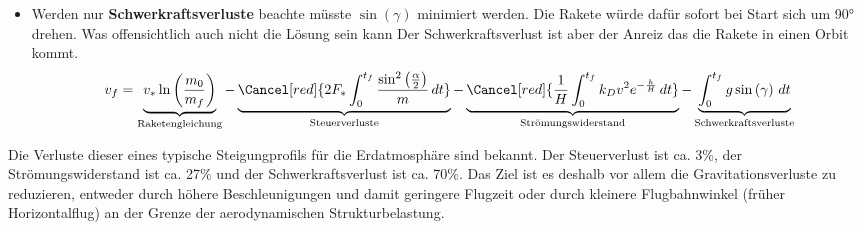 \begin{itemize}
	\item Werden nur \textbf{Schwerkraftsverluste} beachte müsste $\sin(\gamma)$ minimiert werden.
	Die Rakete würde dafür sofort bei Start sich um 90° drehen.
	Was offensichtlich auch nicht die Lösung sein kann
	Der Schwerkraftsverlust ist aber der Anreiz das die Rakete in einen Orbit kommt.
	\begin{equation*}
		v_f = \underbrace{v_* \ln \left(\frac{m_0}{m_f}\right)}_{\text{Raketengleichung}} 
		- \underbrace{\Cancel[red]{2F_* \int_0^{t_f} \frac{\sin^2\left(\frac{\alpha}{2}\right)}{m} \, dt }}_{\text{Steuerverluste}}
		- \underbrace{\Cancel[red]{\frac{1}{H} \int_0^{t_f} k_Dv^2 e^{-\frac{h}{H}} \, dt }}_{\text{Strömungswiderstand}}
		- \underbrace{\int_0^{t_f} g \sin \left(\gamma\right) \, dt}_{\text{Schwerkraftsverluste}}
	\end{equation*}
\end{itemize}

Die Verluste dieser eines typische Steigungprofils für die Erdatmosphäre sind bekannt. Der Steuerverlust ist ca. 3\%, der Strömungswiderstand ist ca. 27\% und der Schwerkraftsverlust ist ca. 70\%. Das Ziel ist es deshalb vor allem die Gravitationsverluste zu reduzieren, entweder durch höhere Beschleunigungen und damit geringere Flugzeit oder durch kleinere Flugbahnwinkel (früher Horizontalflug) an der Grenze der aerodynamischen Strukturbelastung.

